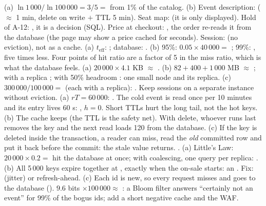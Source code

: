  (a) $\ln 1\,000 / \ln 100\,000 = 3/5 =$  from 1\% of the catalog. (b) Event description:  ($\approx$ 1 min, delete on write $+$ TTL 5 min). Seat map:  (it is only displayed). Hold of A-12: , it is a decision (SQL). Price at checkout: , the order re-reads it from the database (the page may show a price cached for seconds). Session:  (no eviction), not as a cache.
 (a) $t_\text{eff}$: ; database: . (b) 95\%: $0.05 \times 40\,000 =$ ; 99\%: , five times less. Four points of hit ratio are a factor of 5 in the miss ratio, which is what the database feels.
 (a) $20\,000 \times 4.1$ KB $\approx$ . (b) $82 + 400 + 1\,000$ MB $\approx$ ; with a replica ; with 50\% headroom : one small node and its replica. (c) $300\,000 / 100\,000 =$  (each with a replica): . Keep sessions on a separate instance without eviction.
 (a) $rT = 60\,000$: . The cold event is read once per 10 minutes and its entry lives 60 s: , $h = 0$. Short TTLs hurt the long tail, not the hot keys. (b) The cache keeps  (the TTL is the safety net). With delete, whoever runs last removes the key and the next read loads 120 from the database. (c) If the key is deleted inside the transaction, a reader can miss, read the \emph{old} committed row and put it back before the commit: the stale value returns. .
 (a) Little's Law: $20\,000 \times 0.2 =$  hit the database at once; with coalescing, one query per replica: . (b) All 5\,000 keys expire together at , exactly when the on-sale starts: an . Fix:  (jitter) or refresh-ahead. (c) Each id is new, so every request misses and goes to the database (). $9.6$ bits $\times 100\,000 \approx$ : a Bloom filter answers ``certainly not an event'' for 99\% of the bogus ids; add a short negative cache and the WAF.
